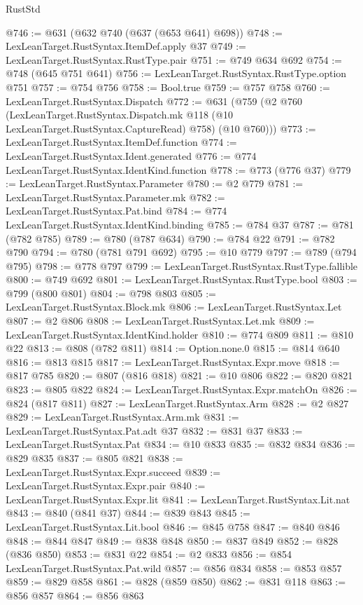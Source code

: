 \begin{lexlean}{RustStd}
\begin{coremodule}
@746 := @631 (@632 @740 (@637 (@653 @641) @698))
@748 := LexLeanTarget.RustSyntax.ItemDef.apply @37
@749 := LexLeanTarget.RustSyntax.RustType.pair
@751 := @749 @634 @692
@754 := @748 (@645 @751 @641)
@756 := LexLeanTarget.RustSyntax.RustType.option @751
@757 := @754 @756
@758 := Bool.true
@759 := @757 @758
@760 := LexLeanTarget.RustSyntax.Dispatch
@772 := @631
    (@759
      (@2
        @760
        (LexLeanTarget.RustSyntax.Dispatch.mk @118 (@10 LexLeanTarget.RustSyntax.CaptureRead) @758)
        (@10 @760)))
@773 := LexLeanTarget.RustSyntax.ItemDef.function
@774 := LexLeanTarget.RustSyntax.Ident.generated
@776 := @774 LexLeanTarget.RustSyntax.IdentKind.function
@778 := @773 (@776 @37)
@779 := LexLeanTarget.RustSyntax.Parameter
@780 := @2 @779
@781 := LexLeanTarget.RustSyntax.Parameter.mk
@782 := LexLeanTarget.RustSyntax.Pat.bind
@784 := @774 LexLeanTarget.RustSyntax.IdentKind.binding
@785 := @784 @37
@787 := @781 (@782 @785)
@789 := @780 (@787 @634)
@790 := @784 @22
@791 := @782 @790
@794 := @780 (@781 @791 @692)
@795 := @10 @779
@797 := @789 (@794 @795)
@798 := @778 @797
@799 := LexLeanTarget.RustSyntax.RustType.fallible
@800 := @749 @692
@801 := LexLeanTarget.RustSyntax.RustType.bool
@803 := @799 (@800 @801)
@804 := @798 @803
@805 := LexLeanTarget.RustSyntax.Block.mk
@806 := LexLeanTarget.RustSyntax.Let
@807 := @2 @806
@808 := LexLeanTarget.RustSyntax.Let.mk
@809 := LexLeanTarget.RustSyntax.IdentKind.holder
@810 := @774 @809
@811 := @810 @22
@813 := @808 (@782 @811)
@814 := Option.none.{0}
@815 := @814 @640
@816 := @813 @815
@817 := LexLeanTarget.RustSyntax.Expr.move
@818 := @817 @785
@820 := @807 (@816 @818)
@821 := @10 @806
@822 := @820 @821
@823 := @805 @822
@824 := LexLeanTarget.RustSyntax.Expr.matchOn
@826 := @824 (@817 @811)
@827 := LexLeanTarget.RustSyntax.Arm
@828 := @2 @827
@829 := LexLeanTarget.RustSyntax.Arm.mk
@831 := LexLeanTarget.RustSyntax.Pat.adt @37
@832 := @831 @37
@833 := LexLeanTarget.RustSyntax.Pat
@834 := @10 @833
@835 := @832 @834
@836 := @829 @835
@837 := @805 @821
@838 := LexLeanTarget.RustSyntax.Expr.succeed
@839 := LexLeanTarget.RustSyntax.Expr.pair
@840 := LexLeanTarget.RustSyntax.Expr.lit
@841 := LexLeanTarget.RustSyntax.Lit.nat
@843 := @840 (@841 @37)
@844 := @839 @843
@845 := LexLeanTarget.RustSyntax.Lit.bool
@846 := @845 @758
@847 := @840 @846
@848 := @844 @847
@849 := @838 @848
@850 := @837 @849
@852 := @828 (@836 @850)
@853 := @831 @22
@854 := @2 @833
@856 := @854 LexLeanTarget.RustSyntax.Pat.wild
@857 := @856 @834
@858 := @853 @857
@859 := @829 @858
@861 := @828 (@859 @850)
@862 := @831 @118
@863 := @856 @857
@864 := @856 @863

\end{coremodule}
\end{lexlean}
